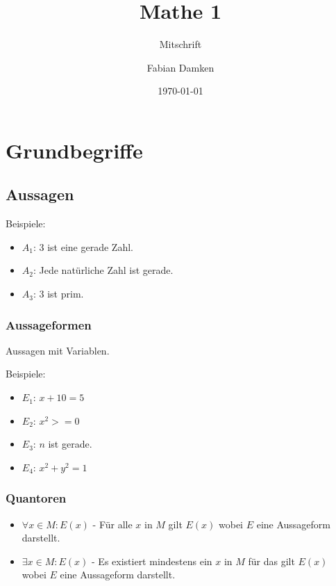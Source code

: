 \documentclass[12pt]{scrreprt}
\title{Mathe 1}
\subtitle{Mitschrift}
\author{Fabian Damken}
\date{\today}
\begin{document}
    \maketitle
    \tableofcontents

    \chapter{Grundbegriffe}
        \section{Aussagen}
            Beispiele:
            \begin{itemize}
                \item $ A _ 1 $: $ 3 $ ist eine gerade Zahl.
                \item $ A _ 2 $: Jede natürliche Zahl ist gerade.
                \item $ A _ 3 $: $ 3 $ ist prim.
            \end{itemize}


            \subsection{Aussageformen}
                Aussagen mit Variablen.

                Beispiele:
                \begin{itemize}
                    \item $ E _ 1 $: $ x + 10 = 5 $
                    \item $ E _ 2 $: $ x ^ { 2 } >= 0 $ 
                    \item $ E _ 3 $: $ n $ ist gerade.
                    \item $ E _ 4 $: $ x ^ { 2 } + y ^ { 2 } = 1 $
                \end{itemize}


            \subsection{Quantoren}
                \begin{itemize}
                    \item $ \forall x \in M : E(x) $ - Für alle $ x $ in $ M $ gilt $ E(x) $ wobei $ E $ eine Aussageform darstellt.
                    \item $ \exists x \in M : E(x) $ - Es existiert mindestens ein $ x $ in $ M $ für das gilt $ E(x) $ wobei $ E $ eine Aussageform darstellt.
                \end{itemize}
\end{document}
